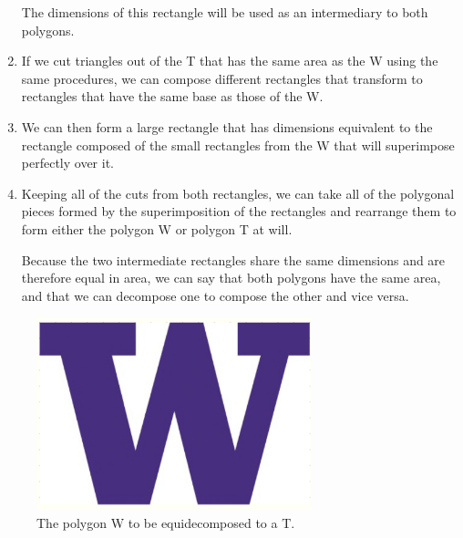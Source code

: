 \documentclass{article}
\begin{document}
\begin{enumerate}
    The dimensions of this rectangle will be used as an intermediary to both polygons.
    
    \item If we cut triangles out of the T that has the same area as the W using the same procedures, we can compose different rectangles that transform to rectangles that have the same base as those of the W.
    
    \item We can then form a large rectangle that has dimensions equivalent to the rectangle composed of the small rectangles from the W that will superimpose perfectly over it.
    
    \item Keeping all of the cuts from both rectangles, we can take all of the polygonal pieces formed by the superimposition of the rectangles and rearrange them to form either the polygon W or polygon T at will.
    
    Because the two intermediate rectangles share the same dimensions and are therefore equal in area, we can say that both polygons have the same area, and that we can decompose one to compose the other and vice versa.
    
    
\end{enumerate}

\begin{figure}[ht]
    \centering
    \includegraphics[width=8cm]{Capstone Presentation/Draft Diagrams/Section 2 Diagrams/3.3 Rough Diagrams 1.png}
    
    \caption{The polygon W to be equidecomposed to a T.} 
    \label{Fig_Rough_1}
\end{figure}
\end{document}
